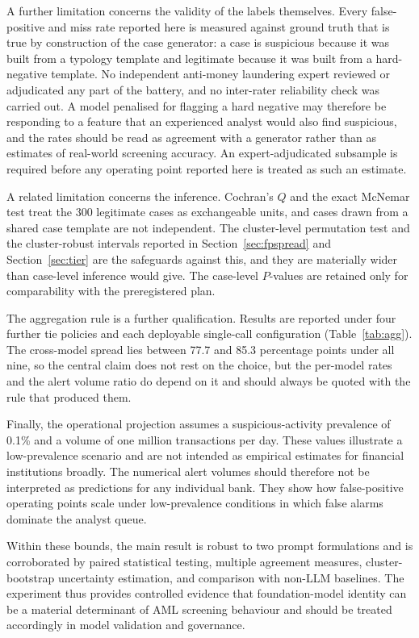 \documentclass[pdflatex,sn-basic,Numbered]{sn-jnl}
\begin{document}
A further limitation concerns the validity of the labels themselves. Every false-positive and miss rate reported here is measured against ground truth that is true by construction of the case generator: a case is suspicious because it was built from a typology template and legitimate because it was built from a hard-negative template. No independent anti-money laundering expert reviewed or adjudicated any part of the battery, and no inter-rater reliability check was carried out. A model penalised for flagging a hard negative may therefore be responding to a feature that an experienced analyst would also find suspicious, and the rates should be read as agreement with a generator rather than as estimates of real-world screening accuracy. An expert-adjudicated subsample is required before any operating point reported here is treated as such an estimate.

A related limitation concerns the inference. Cochran's $Q$ and the exact McNemar test treat the 300 legitimate cases as exchangeable units, and cases drawn from a shared case template are not independent. The cluster-level permutation test and the cluster-robust intervals reported in Section~\ref{sec:fpspread} and Section~\ref{sec:tier} are the safeguards against this, and they are materially wider than case-level inference would give. The case-level $P$-values are retained only for comparability with the preregistered plan.

The aggregation rule is a further qualification. Results are reported under four further tie policies and each deployable single-call configuration (Table~\ref{tab:agg}). The cross-model spread lies between 77.7 and 85.3 percentage points under all nine, so the central claim does not rest on the choice, but the per-model rates and the alert volume ratio do depend on it and should always be quoted with the rule that produced them.

Finally, the operational projection assumes a suspicious-activity prevalence of 0.1\% and a volume of one million transactions per day. These values illustrate a low-prevalence scenario and are not intended as empirical estimates for financial institutions broadly. The numerical alert volumes should therefore not be interpreted as predictions for any individual bank. They show how false-positive operating points scale under low-prevalence conditions in which false alarms dominate the analyst queue.

Within these bounds, the main result is robust to two prompt formulations and is corroborated by paired statistical testing, multiple agreement measures, cluster-bootstrap uncertainty estimation, and comparison with non-LLM baselines. The experiment thus provides controlled evidence that foundation-model identity can be a material determinant of AML screening behaviour and should be treated accordingly in model validation and governance.
\end{document}
